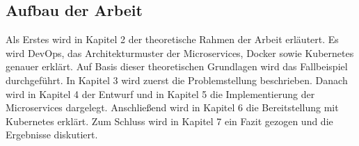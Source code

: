 \subsection{Aufbau der Arbeit}

Als Erstes wird in Kapitel 2 der theoretische Rahmen der Arbeit erläutert. Es wird DevOps, das Architekturmuster der Microservices, Docker sowie Kubernetes genauer erklärt. Auf Basis dieser theoretischen Grundlagen wird das Fallbeispiel durchgeführt. In Kapitel 3 wird zuerst die Problemstellung beschrieben. Danach wird in Kapitel 4 der Entwurf und in Kapitel 5 die Implementierung der Microservices dargelegt. Anschließend wird in Kapitel 6 die Bereitstellung mit Kubernetes erklärt. Zum Schluss wird in Kapitel 7 ein Fazit gezogen und die Ergebnisse diskutiert.


